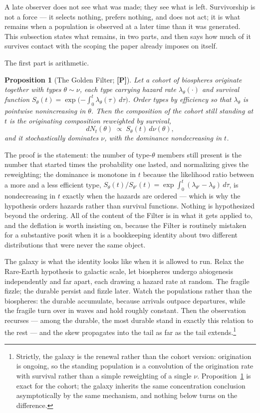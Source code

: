 \documentclass[11pt]{article}
\numberwithin{equation}{section}
\theoremstyle{plain}
\newtheorem{proposition}[theorem]{Proposition}
\theoremstyle{definition}
\theoremstyle{remark}
\begin{document}
A late observer does not see what was made; they see what is left. Survivorship is not a force --- it selects nothing, prefers nothing, and does not act; it is what remains when a population is observed at a later time than it was generated. This subsection states what remains, in two parts, and then says how much of it survives contact with the scoping the paper already imposes on itself.

The first part is arithmetic.

\begin{proposition}[The Golden Filter; \textbf{[P]}]\label{ac:prop:filter}
Let a cohort of biospheres originate together with types $\theta \sim \nu$, each type carrying hazard rate $\lambda_\theta(\cdot)$ and survival function $S_\theta(t) = \exp\!\big({-\int_0^t \lambda_\theta(\tau)\,d\tau}\big)$. Order types by efficiency so that $\lambda_\theta$ is pointwise nonincreasing in $\theta$. Then the composition of the cohort still standing at $t$ is the originating composition reweighted by survival,
\[
    dN_t(\theta) \;\propto\; S_\theta(t) \, d\nu(\theta),
\]
and it stochastically dominates $\nu$, with the dominance nondecreasing in $t$.
\end{proposition}

The proof is the statement: the number of type-$\theta$ members still present is the number that started times the probability one lasted, and normalizing gives the reweighting; the dominance is monotone in $t$ because the likelihood ratio between a more and a less efficient type, $S_\theta(t)/S_{\theta'}(t) = \exp\!\int_0^t (\lambda_{\theta'} - \lambda_\theta)\,d\tau$, is nondecreasing in $t$ exactly when the hazards are ordered --- which is why the hypothesis orders hazards rather than survival functions. Nothing is hypothesized beyond the ordering. All of the content of the Filter is in what it gets applied to, and the deflation is worth insisting on, because the Filter is routinely mistaken for a substantive posit when it is a bookkeeping identity about two different distributions that were never the same object.

The galaxy is what the identity looks like when it is allowed to run. Relax the Rare-Earth hypothesis to galactic scale, let biospheres undergo abiogenesis independently and far apart, each drawing a hazard rate at random. The fragile fizzle; the durable persist and fizzle later. Watch the populations rather than the biospheres: the durable accumulate, because arrivals outpace departures, while the fragile turn over in waves and hold roughly constant. Then the observation recurses --- among the durable, the most durable stand in exactly this relation to the rest --- and the skew propagates into the tail as far as the tail extends.\footnote{Strictly, the galaxy is the renewal rather than the cohort version: origination is ongoing, so the standing population is a convolution of the origination rate with survival rather than a simple reweighting of a single $\nu$. Proposition~\ref{ac:prop:filter} is exact for the cohort; the galaxy inherits the same concentration conclusion asymptotically by the same mechanism, and nothing below turns on the difference.}
\end{document}
